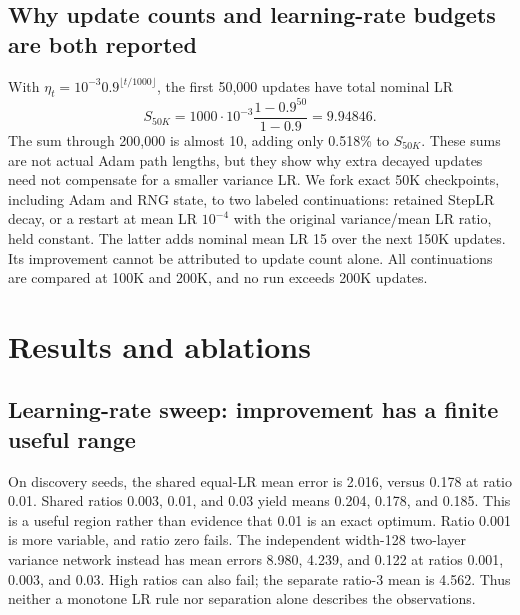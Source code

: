 \documentclass[11pt,a4paper]{article}
\begin{document}
\subsection{Why update counts and learning-rate budgets are both reported}
With $\eta_t=10^{-3}0.9^{\lfloor t/1000\rfloor}$, the first 50,000 updates
have total nominal LR
\[
 S_{50K}=1000\cdot10^{-3}\frac{1-0.9^{50}}{1-0.9}=9.94846.
\]
The sum through 200,000 is almost 10, adding only 0.518\% to $S_{50K}$.
These sums are not actual Adam path lengths, but they show why extra decayed
updates need not compensate for a smaller variance LR. We fork exact 50K
checkpoints, including Adam and RNG state, to two labeled continuations:
retained StepLR decay, or a restart at mean LR $10^{-4}$ with the original
variance/mean LR ratio, held constant. The latter adds nominal mean LR 15
over the next 150K updates. Its improvement cannot be attributed to update
count alone. All continuations are compared at 100K and 200K, and no run
exceeds 200K updates.

\section{Results and ablations}
\subsection{Learning-rate sweep: improvement has a finite useful range}
On discovery seeds, the shared equal-LR mean error is 2.016, versus 0.178 at ratio 0.01. Shared ratios 0.003, 0.01, and 0.03 yield means 0.204, 0.178, and 0.185. This is a useful region rather than evidence that 0.01 is an exact optimum. Ratio 0.001 is more variable, and ratio zero fails. The independent width-128 two-layer variance network instead has mean errors 8.980, 4.239, and 0.122 at ratios 0.001, 0.003, and 0.03. High ratios can also fail; the separate ratio-3 mean is 4.562. Thus neither a monotone LR rule nor separation alone describes the observations.
\end{document}
